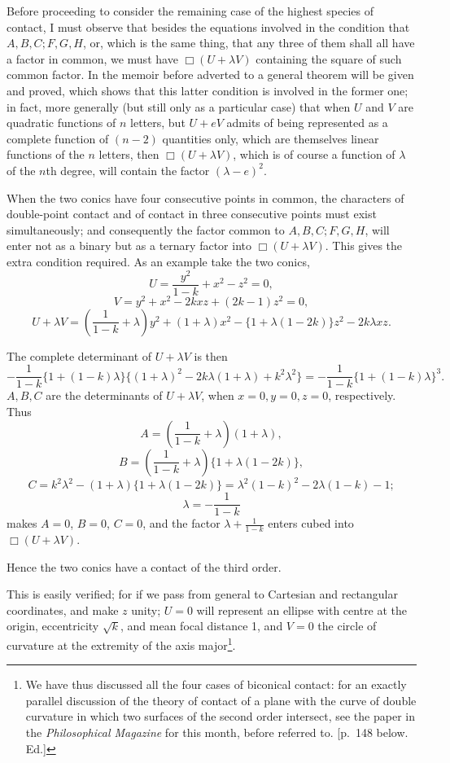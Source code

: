 \documentclass[11pt]{article}
\newcommand{\sourcepage}[1]{\marginpar{\scriptsize p.~#1}}
\begin{document}
Before proceeding to consider the remaining case of the highest species of contact, I must observe that besides the equations involved in the condition that $A,B,C;F,G,H$, or, which is the same thing, that any three of them shall all have a factor in common, we must have $\Box(U+\lambda V)$ containing the square of such common factor. In the memoir before adverted to a general theorem will be given and proved, which shows that this latter condition is involved in the former one; in fact, more generally (but still only as a particular case) that when $U$ and $V$ are quadratic functions of $n$ letters, but $U+eV$ admits of being represented as a complete function of $(n-2)$ quantities only, which are themselves linear functions of the $n$ letters, then $\Box(U+\lambda V)$, which is of course a function of $\lambda$ of the $n$th degree, will contain the factor $(\lambda-e)^2$.

When the two conics have four consecutive points in common, the characters of double-point contact and of contact in three consecutive points must exist simultaneously; and consequently the factor common to $A,B,C;F,G,H$, will enter not as a binary but as a ternary factor into $\Box(U+\lambda V)$. This gives the extra condition required. As an example take the two conics,
\[
U=\frac{y^2}{1-k}+x^2-z^2=0,
\]
\[
V=y^2+x^2-2kxz+(2k-1)z^2=0,
\]
\[
U+\lambda V=\left(\frac{1}{1-k}+\lambda\right)y^2+(1+\lambda)x^2-\{1+\lambda(1-2k)\}z^2-2k\lambda xz.
\]

\sourcepage{135}
The complete determinant of $U+\lambda V$ is then
\[
-\frac{1}{1-k}\{1+(1-k)\lambda\}\{(1+\lambda)^2-2k\lambda(1+\lambda)+k^2\lambda^2\}
=-\frac{1}{1-k}\{1+(1-k)\lambda\}^3.
\]
$A,B,C$ are the determinants of $U+\lambda V$, when $x=0,y=0,z=0$, respectively. Thus
\[
A=\left(\frac{1}{1-k}+\lambda\right)(1+\lambda),
\]
\[
B=\left(\frac{1}{1-k}+\lambda\right)\{1+\lambda(1-2k)\},
\]
\[
C=k^2\lambda^2-(1+\lambda)\{1+\lambda(1-2k)\}
=\lambda^2(1-k)^2-2\lambda(1-k)-1;
\]
\[
\lambda=-\frac{1}{1-k}
\]
makes $A=0$, $B=0$, $C=0$, and the factor $\lambda+\frac{1}{1-k}$ enters cubed into $\Box(U+\lambda V)$.

Hence the two conics have a contact of the third order.

This is easily verified; for if we pass from general to Cartesian and rectangular coordinates, and make $z$ unity; $U=0$ will represent an ellipse with centre at the origin, eccentricity $\sqrt{k}$, and mean focal distance 1, and $V=0$ the circle of curvature at the extremity of the axis major\footnote{We have thus discussed all the four cases of biconical contact: for an exactly parallel discussion of the theory of contact of a plane with the curve of double curvature in which two surfaces of the second order intersect, see the paper in the \emph{Philosophical Magazine} for this month, before referred to. [p.~148 below. Ed.]}.
\end{document}
